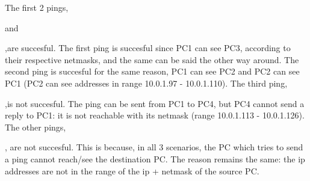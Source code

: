 The first 2 pings, \newline

 and \newline

,are succesful. The first ping is succesful since PC1 can see PC3, according to their respective netmasks, and the same can be said the other way around. \newline
The second ping is succesful for the same reason, PC1 can see PC2 and PC2 can see PC1 (PC2 can see addresses in range 10.0.1.97 - 10.0.1.110). \newline
\newline
The third ping, \newline

,is not succesful. The ping can be sent from PC1 to PC4, but PC4 cannot send a reply to PC1: it is not reachable with its netmask (range 10.0.1.113 - 10.0.1.126). \newline
\newline
The other pings, \newline



, are not succesful. This is because, in all 3 scenarios, the PC which tries to send a ping cannot reach/see the destination PC. The reason remains the same: the ip addresses are not in the range of the ip + netmask of the source PC.